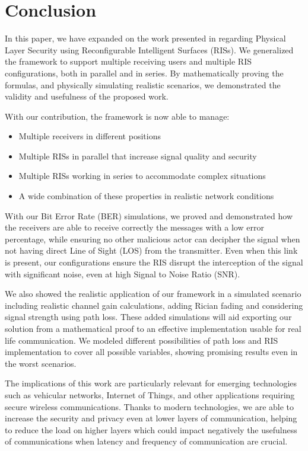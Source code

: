 \section{Conclusion}

In this paper, we have expanded on the work presented in \cite{9328149} regarding Physical Layer Security using Reconfigurable Intelligent Surfaces (RISs). We generalized the framework to support multiple receiving users and multiple RIS configurations, both in parallel and in series. By mathematically proving the formulas, and physically simulating realistic scenarios, we demonstrated the validity and usefulness of the proposed work.

With our contribution, the framework is now able to manage:
\begin{itemize}
  \item Multiple receivers in different positions
  \item Multiple RISs in parallel that increase signal quality and security
  \item Multiple RISs working in series to accommodate complex situations
  \item A wide combination of these properties in realistic network conditions
\end{itemize}

With our Bit Error Rate (BER) simulations, we proved and demonstrated how the receivers are able to receive correctly the messages with a low error percentage, while ensuring no other malicious actor can decipher the signal when not having direct Line of Sight (LOS) from the transmitter. Even when this link is present, our configurations ensure the RIS disrupt the interception of the signal with significant noise, even at high Signal to Noise Ratio (SNR).

We also showed the realistic application of our framework in a simulated scenario including realistic channel gain calculations, adding Rician fading and considering signal strength using path loss. These added simulations will aid exporting our solution from a mathematical proof to an effective implementation usable for real life communication. We modeled different possibilities of path loss and RIS implementation to cover all possible variables, showing promising results even in the worst scenarios.

The implications of this work are particularly relevant for emerging technologies such as vehicular networks, Internet of Things, and other applications requiring secure wireless communications. Thanks to modern technologies, we are able to increase the security and privacy even at lower layers of communication, helping to reduce the load on higher layers which could impact negatively the usefulness of communications when latency and frequency of communication are crucial.

